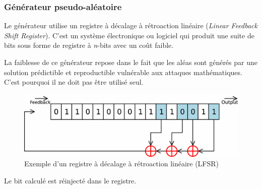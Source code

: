 \documentclass[12pt, a4paper]{article}
\begin{document}
	\subsubsection{Générateur pseudo-aléatoire}
	Le générateur utilise un registre à décalage à rétroaction linéaire (\textit{Linear Feedback Shift Register}). C'est un système électronique ou logiciel qui produit une suite de bits sous forme de registre à \textit{n}-bits avec un coût faible.
	\par
	La faiblesse de ce générateur repose dans le fait que les aléas sont générés par une solution prédictible et reproductible vulnérable aux attaques mathématiques. C'est pourquoi il ne doit pas être utilisé seul.
	\begin{figure}[!ht]
		\centering
		\includegraphics{images/Lfsr}
		\caption{Exemple d'un registre à décalage à rétroaction linéaire (LFSR)}
		\label{fig:lfsr}
	\end{figure}
	Le bit calculé est réinjecté dans le registre.
\end{document}
